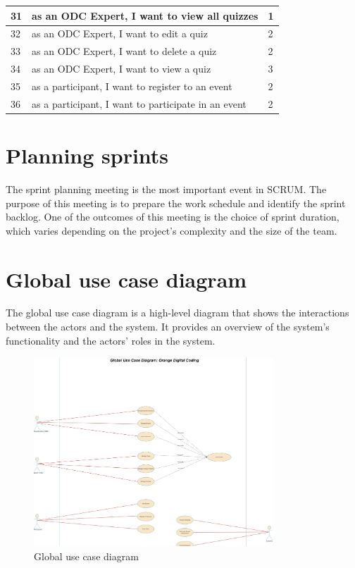 \begin{longtable}{|l|l|l|}
      31                     & as an ODC Expert, I want to view all quizzes             & 1                 \\ \hline
      32                     & as an ODC Expert, I want to edit a quiz                  & 2                 \\ \hline
      33                     & as an ODC Expert, I want to delete a quiz                & 2                 \\ \hline
      34                     & as an ODC Expert, I want to view a quiz                  & 3                 \\ \hline
      35                     & as a participant, I want to register to an event         & 2                 \\ \hline
      36                     & as a participant, I want to participate in an event      & 2                 \\ \hline
\end{longtable}


\section{Planning sprints}
The sprint planning meeting is the most important event in SCRUM. The purpose
of this meeting is to prepare the work schedule and identify the sprint
backlog. One of the outcomes of this meeting is the choice of sprint duration,
which varies depending on the project's complexity and the size of the team.


\section{Global use case diagram}
The global use case diagram is a high-level diagram that shows the interactions
between the actors and the system. It provides an overview of the system's
functionality and the actors' roles in the system.
\begin{figure}[h!]
      \centering

      \includegraphics[width=0.8\textwidth]{images/useCaseGlobal.png}
      \caption{Global use case diagram}
      \label{fig:use_case_diagram}
\end{figure}



